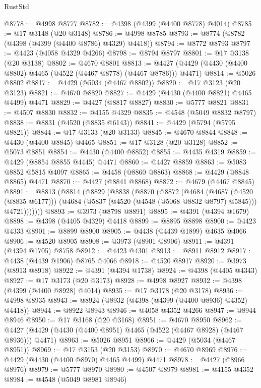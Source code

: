 \begin{lexlean}{RustStd}
\begin{coremodule}
@8778 := @4998 @8777
@8782 := @4398 (@4399 (@4400 @8778) @4014)
@8785 := @17 @3148 (@20 @3148)
@8786 := @4998 @8785
@8793 := @8774 (@8782 (@4398 (@4399 (@4400 @8786) @4329) @4418))
@8794 := @8772 @8793
@8797 := @4423 (@4058 @4329 @4266)
@8798 := @8794 @8797
@8801 := @17 @3138 (@20 @3138)
@8802 := @4670 @8801
@8813 := @4427 (@4429 (@4430 (@4400 @8802) @4465 (@4522 (@4467 @8778) (@4467 @8786))) @4471)
@8814 := @5026 @8802
@8817 := @4429 (@5034 (@4467 @8802))
@8820 := @17 @3123 (@20 @3123)
@8821 := @4670 @8820
@8827 := @4429 (@4430 (@4400 @8821) @4465 @4499) @4471
@8829 := @4427 (@8817 @8827)
@8830 := @5777 @8821
@8831 := @4507 @8830
@8832 := @4155 @4329
@8835 := @4548 (@5049 @8832 @8797)
@8838 := @8831 (@4520 (@8835 @6143))
@8841 := @4429 (@5794 (@5795 @8821))
@8844 := @17 @3133 (@20 @3133)
@8845 := @4670 @8844
@8848 := @4430 (@4400 @8845) @4465
@8851 := @17 @3128 (@20 @3128)
@8852 := @5073 @8851
@8854 := @4430 (@4400 @8852)
@8855 := @4435 @4319
@8859 := @4429 (@8854 @8855 @4445) @4471
@8860 := @4427 @8859
@8863 := @5083 @8852 @5815 @4097
@8865 := @4458 (@8860 @8863)
@8868 := @4429 (@8848 @8865) @4471
@8870 := @4427 (@8841 @8868)
@8872 := @4679 (@4467 @8845)
@8891 := @8813
    (@8814
      (@8829
        (@8838
          (@8870
            (@8872
              (@4684
                (@4687 (@4520 (@8835 @6177)))
                (@4684 (@5837 (@4520 (@4548 (@5068 @8832 @8797) @5845))) @4721)))))))
@8893 := @3973 (@8798 @8891)
@8895 := @4391 (@4394 @1679)
@8898 := @4398 (@4405 @4329) @4418
@8899 := @8895 @8898
@8900 := @4423 @4333
@8901 := @8899 @8900
@8905 := @4438 (@4439 @1899) @4635 @4066
@8906 := @4520 @8905
@8908 := @3973 (@8901 @8906)
@8911 := @4391 (@4394 @1705) @8758
@8912 := @4423 @4301
@8913 := @8911 @8912
@8917 := @4438 (@4439 @1906) @8765 @4066
@8918 := @4520 @8917
@8920 := @3973 (@8913 @8918)
@8922 := @4391 (@4394 @1738)
@8924 := @4398 (@4405 @4343)
@8927 := @17 @3173 (@20 @3173)
@8928 := @4998 @8927
@8932 := @4398 (@4399 (@4400 @8928) @4014)
@8935 := @17 @3178 (@20 @3178)
@8936 := @4998 @8935
@8943 := @8924 (@8932 (@4398 (@4399 (@4400 @8936) @4352) @4418))
@8944 := @8922 @8943
@8946 := @4058 @4352 @4266
@8947 := @8944 @8946
@8950 := @17 @3168 (@20 @3168)
@8951 := @4670 @8950
@8962 := @4427 (@4429 (@4430 (@4400 @8951) @4465 (@4522 (@4467 @8928) (@4467 @8936))) @4471)
@8963 := @5026 @8951
@8966 := @4429 (@5034 (@4467 @8951))
@8969 := @17 @3153 (@20 @3153)
@8970 := @4670 @8969
@8976 := @4429 (@4430 (@4400 @8970) @4465 @4499) @4471
@8978 := @4427 (@8966 @8976)
@8979 := @5777 @8970
@8980 := @4507 @8979
@8981 := @4155 @4352
@8984 := @4548 (@5049 @8981 @8946)

\end{coremodule}
\end{lexlean}
